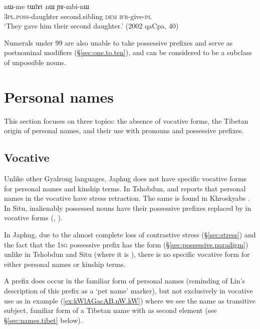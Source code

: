 \begin{exe}
\ex \label{ex:tWlAt}
\gll  nɯ-me tɯlɤt nɯ ɲɤ-mbi-nɯ \\
\textsc{3pl}.\textsc{poss}-daughter second.sibling \textsc{dem} \textsc{ifr}-give-\textsc{pl} \\
\glt `They gave him their second daughter.' (2002 qaCpa, 40)
\end{exe} 

Numerals under 99 are also unable to take possessive prefixes and serve as postnominal modifiers (§\ref{sec:one.to.ten}), and can be considered to be a subclass of unpossible nouns.

\section{Personal names}  \label{sec:personal.names}
This section focuses on three topics: the absence of vocative forms, the Tibetan origin of personal names, and their use with pronouns and possessive prefixes. 

\subsection{Vocative} \label{sec:vocative}
Unlike other Gyalrong languages, Japhug does not have specific vocative forms for personal names and kinship terms. In Tshobdun, \citet[133]{jackson98morphology} and \citet[53]{jackson05yingao} reports that personal names in the vocative have stress retraction. The same is found in Khroskyabs \citep[153]{lai17khroskyabs}. In Situ, inalienably possessed nouns have their possessive prefixes replaced by  in vocative forms (\citealt[471]{nagano03cogtse}, \citealt[177]{prins16kyomkyo}). 

In Japhug, due to the almost complete loss of contrastive stress (§\ref{sec:stress}) and the fact that the \textsc{1sg} possessive prefix has the form  (§\ref{sec:possessive.paradigm}) unlike in Tshobdun and Situ (where it is ), there is no specific vocative form for either personal names or kinship terms. 

A prefix  does occur in the familiar form of personal names (reminding of Lin's \citeyear[162]{linxr93jiarong} description of this prefix as a  `pet name' marker), but not exclusively in vocative use as in example (\ref{ex:kWlAGacAB.nW.kW}) where we see the name  as transitive subject, familiar form of a Tibetan name with  as second element (see §\ref{sec:names.tibet} below).

